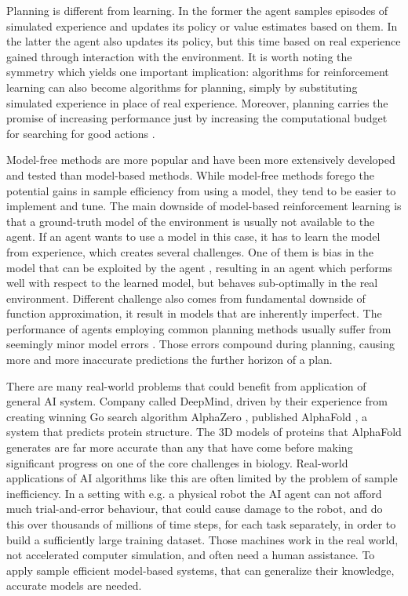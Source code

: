 Planning is different from learning. In the former the agent samples episodes of simulated experience and updates its policy or value estimates based on them. In the latter the agent also updates its policy, but this time based on real experience gained through interaction with the environment. It is worth noting the symmetry which yields one important implication: algorithms for reinforcement learning can also become algorithms for planning, simply by substituting simulated experience in place of real experience. Moreover, planning carries the promise of increasing performance just by increasing the computational budget for searching for good actions \cite{Algo.AlphaGoZero}.

Model-free methods are more popular and have been more extensively developed and tested than model-based methods. While model-free methods forego the potential gains in sample efficiency from using a model, they tend to be easier to implement and tune. The main downside of model-based reinforcement learning is that a ground-truth model of the environment is usually not available to the agent. If an agent wants to use a model in this case, it has to learn the model from experience, which creates several challenges. One of them is bias in the model that can be exploited by the agent \cite{Algo.WorldModels}, resulting in an agent which performs well with respect to the learned model, but behaves sub-optimally in the real environment. Different challenge also comes from fundamental downside of function approximation, it result in models that are inherently imperfect. The performance of agents employing common planning methods usually suffer from seemingly minor model errors \cite{Study.ModelErrorinMC}. Those errors compound during planning, causing more and more inaccurate predictions the further horizon of a plan. 

There are many real-world problems that could benefit from application of general AI system. Company called DeepMind, driven by their experience from creating winning Go search algorithm AlphaZero \cite{Algo.AlphaZero}, published AlphaFold \cite{Algo.AlphaFold}, a system that predicts protein structure. The 3D models of proteins that AlphaFold generates are far more accurate than any that have come before making significant progress on one of the core challenges in biology. Real-world applications of AI algorithms like this are often limited by the problem of sample inefficiency. In a setting with e.g. a physical robot the AI agent can not afford much trial-and-error behaviour, that could cause damage to the robot, and do this over thousands of millions of time steps, for each task separately, in order to build a sufficiently large training dataset. Those machines work in the real world, not accelerated computer simulation, and often need a human assistance. To apply sample efficient model-based systems, that can generalize their knowledge, accurate models are needed.

